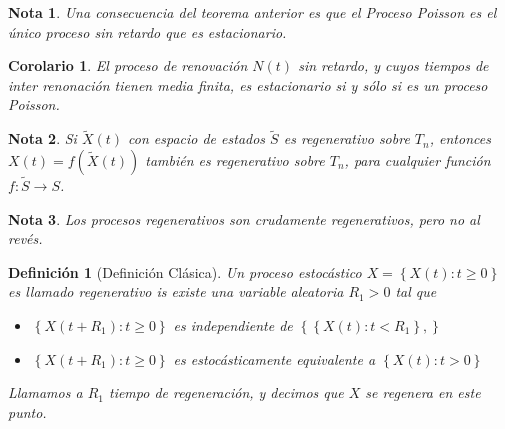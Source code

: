\documentclass{article}
\newtheorem{Def}{Definición}[section]
\newtheorem{Note}{Nota}[section]
\newtheorem{Coro}{Corolario}[section]
\numberwithin{equation}{section}
\begin{document}
\begin{Note}
Una consecuencia del teorema anterior es que el Proceso Poisson es el \'unico proceso sin retardo que es estacionario.
\end{Note}

\begin{Coro}
El proceso de renovaci\'on $N\left(t\right)$ sin retardo, y cuyos tiempos de inter renonaci\'on tienen media finita, es estacionario si y s\'olo si es un proceso Poisson.

\end{Coro}





\begin{Note}
Si $\tilde{X}\left(t\right)$ con espacio de estados $\tilde{S}$ es regenerativo sobre $T_{n}$, entonces $X\left(t\right)=f\left(\tilde{X}\left(t\right)\right)$ tambi\'en es regenerativo sobre $T_{n}$, para cualquier funci\'on $f:\tilde{S}\rightarrow S$.
\end{Note}

\begin{Note}
Los procesos regenerativos son crudamente regenerativos, pero no al rev\'es.
\end{Note}
\begin{Def}[Definici\'on Cl\'asica]
Un proceso estoc\'astico $X=\left\{X\left(t\right):t\geq0\right\}$ es llamado regenerativo is existe una variable aleatoria $R_{1}>0$ tal que
\begin{itemize}
\item[i)] $\left\{X\left(t+R_{1}\right):t\geq0\right\}$ es independiente de $\left\{\left\{X\left(t\right):t<R_{1}\right\},\right\}$
\item[ii)] $\left\{X\left(t+R_{1}\right):t\geq0\right\}$ es estoc\'asticamente equivalente a $\left\{X\left(t\right):t>0\right\}$
\end{itemize}

Llamamos a $R_{1}$ tiempo de regeneraci\'on, y decimos que $X$ se regenera en este punto.
\end{Def}
\end{document}
